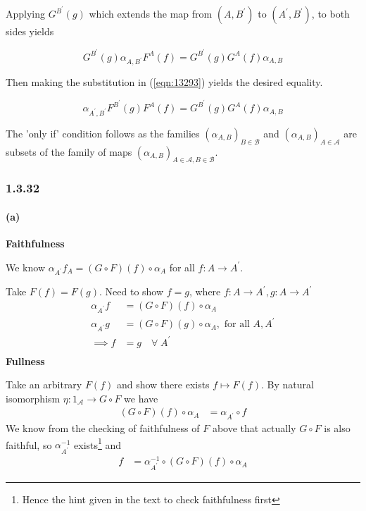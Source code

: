 \documentclass{article}
\begin{document}
Applying $G^{B^{\prime}}(g)$ which extends the map from $(A,B^\prime)$ to $(A^\prime,B^\prime)$, to both sides yields

\begin{equation*}
  G^{B^{\prime}}(g)\alpha_{A, B^\prime}F^A(f) = G^{B^{\prime}}(g)G^A(f)\alpha_{A,B}
\end{equation*}

Then making the substitution in (\ref{eqn:13293}) yields the desired equality.

\begin{equation*}
  \alpha_{A^{\prime},B^{\prime}}F^{B^{\prime}}(g)F^A(f) = G^{B^{\prime}}(g)G^A(f)\alpha_{A,B}
\end{equation*}

The 'only if' condition follows as the families $(\alpha_{A,B})_{B \in \mathcal{B}}$ and $(\alpha_{A,B})_{A \in \mathcal{A}}$ are subsets of the family of maps $(\alpha_{A,B})_{A\in \mathcal{A}, B \in \mathcal{B}}$.

\subsubsection*{1.3.32}

\paragraph{(a)}

\textbf{Faithfulness}

We know $\alpha_{A^\prime}f_A = (G \circ F)(f) \circ \alpha_A$  for all $ f\colon A \rightarrow A^\prime$.

Take $F(f) = F(g)$. Need to show $f=g$, where $f\colon A \rightarrow A^\prime, g\colon A \rightarrow A^\prime$
\begin{align*}
  \alpha_{A^\prime}f &= (G \circ F)(f) \circ \alpha_{A}\\
  \alpha_{A^\prime}g &= (G \circ F)(g) \circ \alpha_{A}, \text{ for all } A, A^\prime\\
  \implies f &= g \quad \forall \; A^\prime \\
\end{align*}
\textbf{Fullness}

Take an arbitrary $F(f)$ and show there exists $f \mapsto F(f)$. By natural isomorphism $\eta : 1_\mathcal{A} \rightarrow G \circ F$ we have
\begin{align*}
  (G\circ F)(f) \circ \alpha_A &= \alpha_{A^\prime} \circ f
\end{align*}
We know from the checking of faithfulness of $F$ above that actually $G \circ F$ is also faithful, so $\alpha_{A^\prime}^{-1}$ exists\footnote{Hence the hint given in the text to check faithfulness first} and
\begin{align*}
  f &= \alpha_{A^\prime}^{-1} \circ (G \circ F)(f) \circ \alpha_A
\end{align*}
\end{document}
